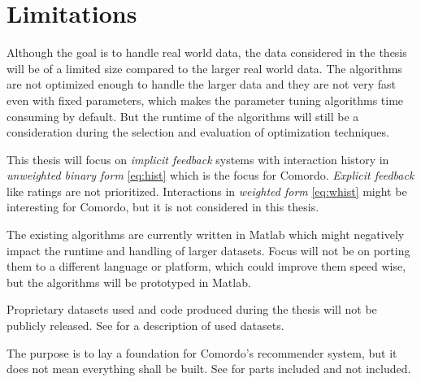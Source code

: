 
\section{Limitations}\label{sec:intro:limitations}

Although the goal is to handle real world data, the data considered in the thesis will be of a limited size compared to the larger real world data. The algorithms are not optimized enough to handle the larger data and they are not very fast even with fixed parameters, which makes the parameter tuning algorithms time consuming by default. But the runtime of the algorithms will still be a consideration during the selection and evaluation of optimization techniques.

This thesis will focus on \textit{implicit feedback} systems with interaction history in \textit{unweighted binary form} \eqref{eq:hist} which is the focus for Comordo. \textit{Explicit feedback} like ratings are not prioritized. Interactions in \textit{weighted form} \eqref{eq:whist} might be interesting for Comordo, but it is not considered in this thesis.

The existing algorithms are currently written in Matlab which might negatively impact the runtime and handling of larger datasets. Focus will not be on porting them to a different language or platform, which could improve them speed wise, but the algorithms will be prototyped in Matlab.

Proprietary datasets used and code produced during the thesis will not be publicly released. See  for a description of used datasets.

The purpose is to lay a foundation for Comordo's recommender system, but it does not mean everything shall be built. See  for parts included and not included.

